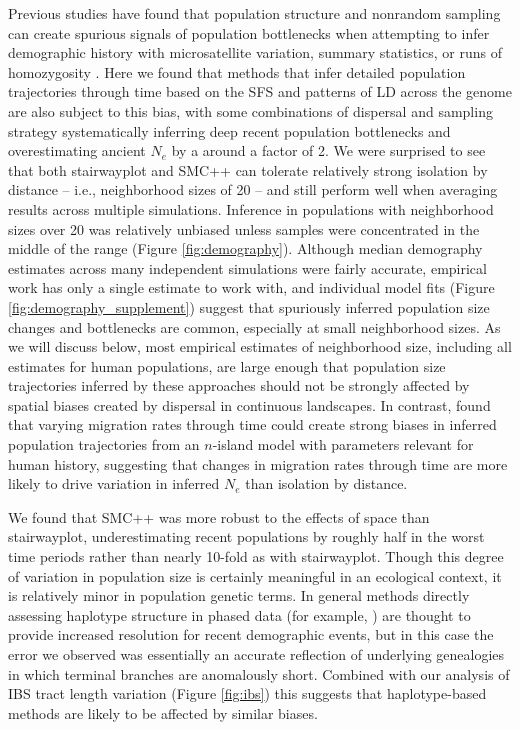 \documentclass[10pt,twoside,lineno,hidelinks]{preprint}
\begin{document}
Previous studies have found that population structure and nonrandom sampling can create spurious signals of population bottlenecks when attempting to infer demographic history with microsatellite variation, summary statistics, or runs of homozygosity \citep{Chikhi2010,Stadler2009,Ptak2002,Mazet2015}. Here we found that methods that infer detailed population trajectories through time based on the SFS and patterns of LD across the genome are also subject to this bias, with some combinations of dispersal and sampling strategy systematically inferring deep recent population bottlenecks and overestimating ancient $N_{e}$ by a around a factor of 2. We were surprised to see that both stairwayplot and SMC++ can tolerate relatively strong isolation by distance -- i.e., neighborhood sizes of 20 -- and still perform well when averaging results across multiple simulations. Inference in populations with neighborhood sizes over 20 was relatively unbiased unless samples were concentrated in the middle of the range (Figure \ref{fig:demography}). 
Although median demography estimates across many independent simulations were fairly accurate,
empirical work has only a single estimate to work with,
and individual model fits (Figure \ref{fig:demography_supplement})
suggest that spuriously inferred population size changes and bottlenecks are common, especially at small neighborhood sizes.
As we will discuss below, most empirical estimates of neighborhood size, including all estimates for human populations, are large enough that population size trajectories inferred by these approaches should not be strongly affected by spatial biases created by dispersal in continuous landscapes. In contrast, \citet{Mazet2015} found that varying migration rates through time could create strong biases in inferred population trajectories from an $n$-island model with parameters relevant for human history, suggesting that changes in migration rates through time are more likely to drive variation in inferred $N_{e}$ than isolation by distance. 

We found that SMC++ was more robust to the effects of space than stairwayplot, underestimating recent populations by roughly half in the worst time periods rather than nearly 10-fold as with stairwayplot. Though this degree of variation in population size is certainly meaningful in an ecological context, it is relatively minor in population genetic terms.  In general methods directly assessing haplotype structure in phased data (for example, \citet{browning2015accurate}) are thought to provide increased resolution for recent demographic events, but in this case the error we observed was essentially an accurate reflection of underlying genealogies in which terminal branches are anomalously short. Combined with our analysis of IBS tract length variation (Figure \ref{fig:ibs}) this suggests that haplotype-based methods are likely to be affected by similar biases. 
\end{document}
